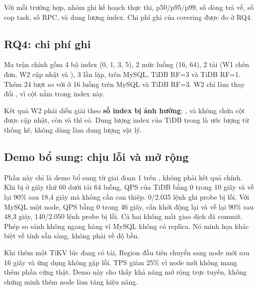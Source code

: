 Với mỗi trường hợp, nhóm ghi kế hoạch thực thi, p50/p95/p99, số dòng trả về, số cop task, số RPC,  và dung lượng index. Chi phí ghi của covering được đo ở RQ4.

\subsection{RQ4: chi phí ghi}

Ma trận chính gồm 4 bộ index (0, 1, 3, 5), 2 mức luồng (16, 64), 2 tải (W1 chèn đơn, W2 cập nhật  và ), 3 lần lặp, trên MySQL, TiDB RF=3 và TiDB RF=1. Thêm 24 lượt so  với  ở 16 luồng trên MySQL và TiDB RF=3. W2 chỉ làm thay đổi , vì cột  nằm trong index này.

Kết quả W2 phải diễn giải theo \textbf{số index bị ảnh hưởng}: ,  và  không chứa cột được cập nhật, còn  và  thì có. Dung lượng index của TiDB trong  là ước lượng từ thống kê, không dùng làm dung lượng vật lý.


\subsection{Demo bổ sung: chịu lỗi và mở rộng}

Phần này chỉ là demo bổ sung từ giai đoạn 1 trên , không phải kết quả chính. Khi  bị  ở giây thứ 60 dưới tải  64 luồng, QPS của TiDB bằng 0 trong 10 giây và về lại 90\% sau 18,4 giây mà không cần can thiệp. 0/2.035 lệnh ghi probe bị lỗi. Với MySQL một node, QPS bằng 0 trong 46 giây, cần khởi động lại và về lại 90\% sau 48,3 giây, 140/2.050 lệnh probe bị lỗi. Cả hai không mất giao dịch đã commit. Phép so sánh không ngang hàng vì MySQL không có replica. Nó minh họa khác biệt về tính sẵn sàng, không phải về độ bền.

Khi thêm một TiKV lúc đang có tải, Region đầu tiên chuyển sang node mới sau 16 giây và ứng dụng không gặp lỗi. TPS giảm 25\% vì node mới không mang thêm phần cứng thật. Demo này cho thấy khả năng mở rộng trực tuyến, không chứng minh thêm node làm tăng hiệu năng.
